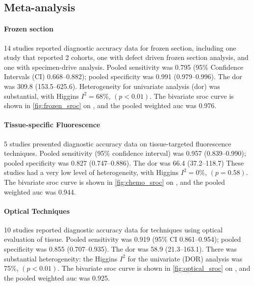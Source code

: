 \subsection{Meta-analysis}

\paragraph{Frozen section}

14 studies reported diagnostic accuracy data for frozen section, including one study \cite{amitImprovingRateNegative2016} that reported 2 cohorts, one with defect driven frozen section analysis, and one with specimen-drive analysis.
Pooled sensitivity was 0.795 (95\% Confidence Intervals (CI) 0.668--0.882); pooled specificity was 0.991 (0.979--0.996).
The \gls{dor} was 309.8 (153.5--625.6).
Heterogeneity for univariate analysis (\gls{dor}) was substantial, with Higgins $I^2 = 68\%$, $(p<0.01)$.
The bivariate \gls{sroc} curve is shown in \cref{fig:frozen_sroc} on , and the pooled weighted \gls{auc} was 0.976. 

\paragraph{Tissue-specific Fluorescence}

5 studies presented diagnostic accuracy data on tissue-targeted fluorescence techniques.
Pooled sensitivity (95\% confidence interval) was 0.957 (0.839--0.990); pooled specificity was 0.827 (0.747--0.886).
The \gls{dor} was 66.4 (37.2--118.7)
These studies had a very low level of heterogeneity, with Higgins $I^2 = 0\%$, $(p=0.58)$.
The bivariate \gls{sroc} curve is shown in \cref{fig:chemo_sroc} on , and the pooled weighted \gls{auc} was 0.944.

\paragraph{Optical Techniques}

10 studies reported diagnostic accuracy data for techniques using optical evaluation of tissue.
Pooled sensitivity was 0.919 (95\% CI 0.861--0.954); pooled specificity was 0.855 (0.707--0.935).
The \gls{dor} was 58.9 (21.3--163.1).
There was substantial heterogeneity: the Higgins $I^2$ for the univariate (DOR) analysis was 75\%, $(p<0.01)$.
The bivariate \gls{sroc} curve is shown in \cref{fig:optical_sroc} on , and the pooled weighted \gls{auc} was 0.925.

